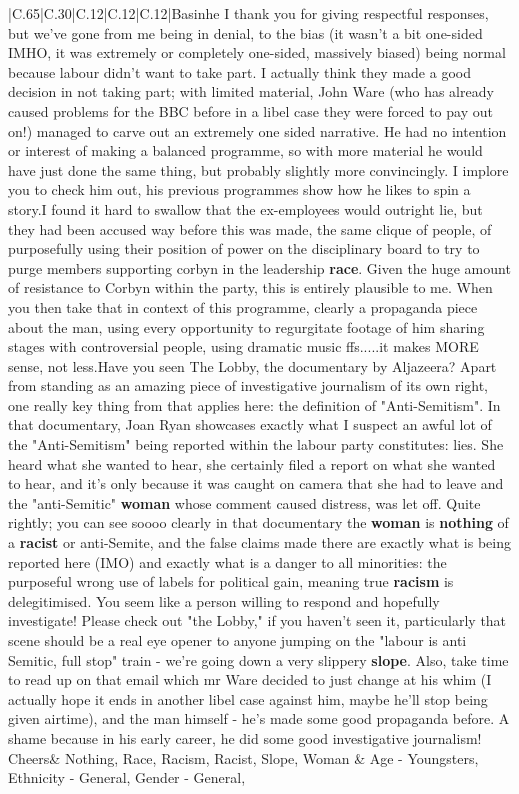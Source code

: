 \documentclass[11pt]{article}
\newlength\mylength
\begin{document}
\begin{center}
\begin{longtable}{|C{.65\mylength}|C{.30\mylength}|C{.12\mylength}|C{.12\mylength}|C{.12\mylength}|}
  \small ​\@H Basinhe  I thank you for giving respectful responses, but we've gone from me being in denial, to the bias (it wasn't a bit one-sided IMHO, it was extremely or completely one-sided, massively biased) being normal because labour didn't want to take part. I actually think they made a good decision in not taking part; with limited material, John Ware (who has already caused problems for the BBC before in a libel case they were forced to pay out on!) managed to carve out an extremely one sided narrative. He had no intention or interest of making a balanced programme, so with more material he would have just done the same thing, but probably slightly more convincingly. I implore you to check him out, his previous programmes show how he likes to spin a story.I found it hard to swallow that the ex-employees would outright lie, but they had been accused way before this was made, the same clique of people, of purposefully using their position of power on the disciplinary board to try to purge members supporting corbyn in the leadership \textbf{race}. Given the huge amount of resistance to Corbyn within the party, this is entirely plausible to me. When you then take that in context of this programme, clearly a propaganda piece about the man, using every opportunity to regurgitate footage of him sharing stages with controversial people, using dramatic music ffs.....it makes MORE sense, not less.Have you seen The Lobby, the documentary by Aljazeera? Apart from standing as an amazing piece of investigative journalism of its own right, one really key thing from that applies here: the definition of "Anti-Semitism". In that documentary, Joan Ryan showcases exactly what I suspect an awful lot of the "Anti-Semitism" being reported within the labour party constitutes: lies. She heard what she wanted to hear, she certainly filed a report on what she wanted to hear, and it's only because it was caught on camera that she had to leave and the "anti-Semitic" \textbf{woman} whose comment caused distress, was let off. Quite rightly; you can see soooo clearly in that documentary the \textbf{woman} is \textbf{nothing} of a \textbf{racist} or anti-Semite, and the false claims made there are exactly what is being reported here (IMO) and exactly what is a danger to all minorities: the purposeful wrong use of labels for political gain, meaning true \textbf{racism} is delegitimised. You seem like a person willing to respond and hopefully investigate! Please check out "the Lobby," if you haven't seen it, particularly that scene should be a real eye opener to anyone jumping on the "labour is anti Semitic, full stop" train - we're going down a very slippery \textbf{slope}. Also, take time to read up on that email which mr Ware decided to just change at his whim (I actually hope it ends in another libel case against him, maybe he'll stop being given airtime), and the man himself - he's made some good propaganda before. A shame because in his early career, he did some good investigative journalism! Cheers\normalsize   & Nothing, Race, Racism, Racist, Slope, Woman & Age - Youngsters, Ethnicity - General, Gender - General, 
\end{longtable}
\end{center}
\end{document}
